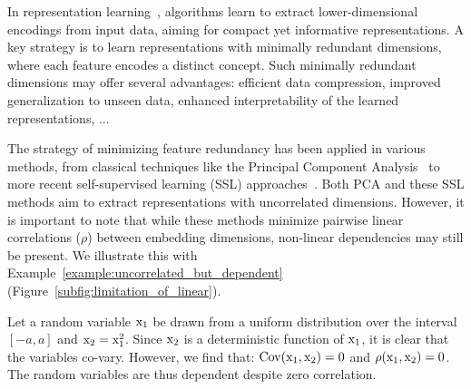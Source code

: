 In representation learning~\citep{rumelhart1986learning_repres,hinton2006deep_belief,bengio2013representation_learn}, algorithms learn to extract lower-dimensional encodings from input data, aiming for compact yet informative representations. 
A key strategy is to learn representations with minimally redundant dimensions, where each feature encodes a distinct concept. 
Such minimally redundant dimensions may offer several advantages: efficient data compression, improved generalization to unseen data, enhanced interpretability of the learned representations, ...




The strategy of minimizing feature redundancy has been applied in various methods, from classical techniques like the Principal Component Analysis~\citep{pearson1901pca_lines_and_planes, hotelling1933pca_2} to more recent self-supervised learning (SSL) approaches~\citep{huang2018decorrelated_bn, zbontar2021barlow_ssl, bardes2021vicreg_ssl}. Both PCA and these SSL methods aim to extract representations with uncorrelated dimensions. 
However, it is important to note that while these methods minimize pairwise linear correlations ($\rho$) between embedding dimensions, non-linear dependencies may still be present. 
We illustrate this with Example~\ref{example:uncorrelated_but_dependent} (Figure~\ref{subfig:limitation_of_linear}). 
\begin{example} \label{example:uncorrelated_but_dependent}
    Let a random variable ${\textnormal{x}}_1$ be drawn from a uniform distribution over the interval $\left[-a,a\right]$ and ${\textnormal{x}}_2 = {\textnormal{x}}_1^2$. Since ${\textnormal{x}}_2$ is a deterministic function of ${\textnormal{x}}_1$, it is clear that the variables co-vary. 
    However, we find that: $\mathrm{Cov}({\textnormal{x}}_1, {\textnormal{x}}_2) = 0$ and $\rho({\textnormal{x}}_1, {\textnormal{x}}_2) = 0$. 
    The random variables are thus dependent despite zero correlation. 
\end{example} 
